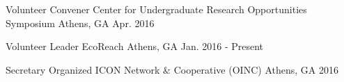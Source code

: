 

\begin{cventries}

    \cventry
    {Volunteer Convener} %
    {Center for Undergraduate Research Opportunities Symposium} %
    {Athens, GA} %
    {Apr. 2016} %
    {
      \begin{cvitems} %
      \end{cvitems}
    }
    
  
  \cventry
    {Volunteer Leader} %
    {EcoReach} %
    {Athens, GA} %
    {Jan. 2016 - Present} %
    {
      \begin{cvitems} %
      \end{cvitems}
    }

\end{cventries}


\begin{cvhonors}
\cvhonor
    {Secretary} %
    {Organized ICON Network \& Cooperative (OINC)} %
    {Athens, GA} %
    {2016} %
 
\end{cvhonors}


